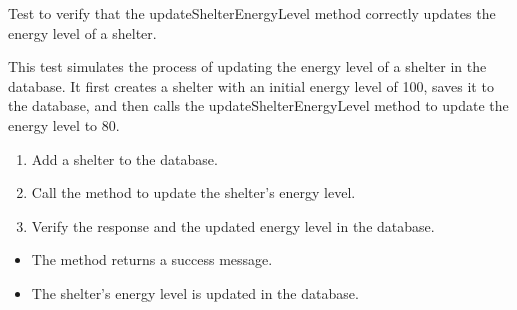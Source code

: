 \documentclass[letterpaper,10pt,english]{sphinxmanual}
\begin{document}
\begin{fulllineitems}
\label{\detokenize{test:test.test_shelter.test_updateShelterEnergyLevel_success}}
\pysigstartsignatures
\pysiglinewithargsret
{}
{\sphinxparamcomma {}}
{}
\pysigstopsignatures
\sphinxAtStartPar
Test to verify that the updateShelterEnergyLevel method correctly updates the energy level of a shelter.

\sphinxAtStartPar
This test simulates the process of updating the energy level of a shelter in the database.
It first creates a shelter with an initial energy level of 100, saves it to the database, and then
calls the updateShelterEnergyLevel method to update the energy level to 80.
\begin{description}
\begin{enumerate}
%
\item {} 
\sphinxAtStartPar
Add a shelter to the database.

\item {} 
\sphinxAtStartPar
Call the  method to update the shelter’s energy level.

\item {} 
\sphinxAtStartPar
Verify the response and the updated energy level in the database.

\end{enumerate}

\begin{itemize}
\item {} 
\sphinxAtStartPar
The method returns a success message.

\item {} 
\sphinxAtStartPar
The shelter’s energy level is updated in the database.

\end{itemize}

\end{description}

\end{fulllineitems}

\end{document}
